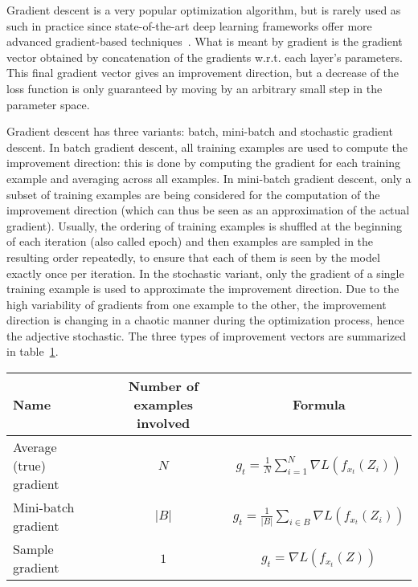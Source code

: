         Gradient descent is a very popular optimization algorithm,
        but is rarely used as such in practice since state-of-the-art deep learning
        frameworks offer more advanced gradient-based techniques~\cite{DBLP:journals/corr/Ruder16}.
        What is meant by gradient is the gradient vector obtained by concatenation of the gradients
        w.r.t. each layer's parameters. This final gradient vector
        gives an improvement direction, but a decrease of the loss function
        is only guaranteed by moving by an arbitrary small step in the parameter space.

        Gradient descent has three variants: batch, mini-batch and stochastic gradient descent.
        In batch gradient descent, all training examples are used to compute the improvement
        direction: this is done by computing the gradient for each training example and averaging
        across all examples. In mini-batch gradient descent, only a subset of training examples
        are being considered for the computation of the improvement direction
        (which can thus be seen as an approximation of the actual gradient). Usually, the ordering
        of training examples is shuffled at the beginning of each iteration (also called epoch)
        and then examples are sampled in the resulting order repeatedly,
        to ensure that each of them is seen by the model exactly once per iteration.
        In the stochastic variant, only the gradient of a single training example is used to
        approximate the improvement direction. Due to the high variability of gradients from one
        example to the other, the improvement direction is changing in a chaotic manner during
        the optimization process, hence the adjective stochastic.
        The three types of improvement vectors are summarized in table~\ref{tab:gradients}.

        \begin{table}[H]
            \centering
            \begin{tabular}{|l|c|c|}
                \hline
                Name & Number of examples involved & Formula \\
                \hline
                \hline
                Average (true) gradient & $N$ & $g_t = \frac{1}{N} \sum\limits_{i=1}^N \nabla L(f_{x_t}(Z_i))$ \\
                \hline
                Mini-batch gradient & $\vert B \vert$ & $g_t = \frac{1}{\vert B \vert} \sum\limits_{i \in B} \nabla L(f_{x_t}(Z_i))$ \\
                \hline
                Sample gradient & $1$ & $g_t = \nabla L(f_{x_t}(Z))$ \\
                \hline
            \end{tabular}
            \label{tab:gradients}
        \end{table}


